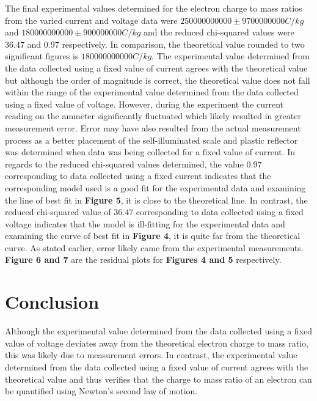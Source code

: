 \documentclass[
	letterpaper, %
	10pt, %
]{CSUniSchoolLabReport}
\begin{document}
The final experimental values determined for the electron charge to mass ratios from the varied
current and voltage data were $250000000000 \pm 9700000000 C/kg$ and $180000000000 \pm 900000000 C/kg$
and the reduced chi-squared values were $36.47$ and $0.97$ respectively. In comparison, the theoretical
value rounded to two significant figures is $180000000000 C/kg$. The experimental value determined
from the data collected using a fixed value of current agrees with the theoretical value but although
the order of magnitude is correct, the theoretical value does not fall within the range of the experimental
value determined from the data collected using a fixed value of voltage. However, during the experiment
the current reading on the ammeter significantly fluctuated which likely resulted in greater
measurement error. Error may have also resulted from the actual measurement process as a better placement
of the self-illuminated scale and plastic reflector was determined when data was being collected for a
fixed value of current. In regards to the reduced chi-squared values determined, the value $0.97$ corresponding to
data collected using a fixed current indicates that the corresponding model used is a good fit for the experimental
data and examining the line of best fit in \textbf{Figure 5}, it is close to the theoretical line. In contrast, the reduced
chi-squared value of $36.47$ corresponding to data collected using a fixed voltage indicates that the model is
ill-fitting for the experimental data and examining the curve of best fit in \textbf{Figure 4}, it is quite far from the
theoretical curve. As stated earlier, error likely came from the experimental measurements. \textbf{Figure 6 and 7} are the residual plots for \textbf{Figures 4 and 5} respectively.

\section{Conclusion}
Although the experimental value determined from the data collected using a fixed value of voltage deviates away from
the theoretical electron charge to mass ratio, this was likely due to measurement errors. In contrast, the experimental
value determined from the data collected using a fixed value of current agrees with the theoretical value and thus verifies
that the charge to mass ratio of an electron can be quantified using Newton's second law of motion.
\end{document}
